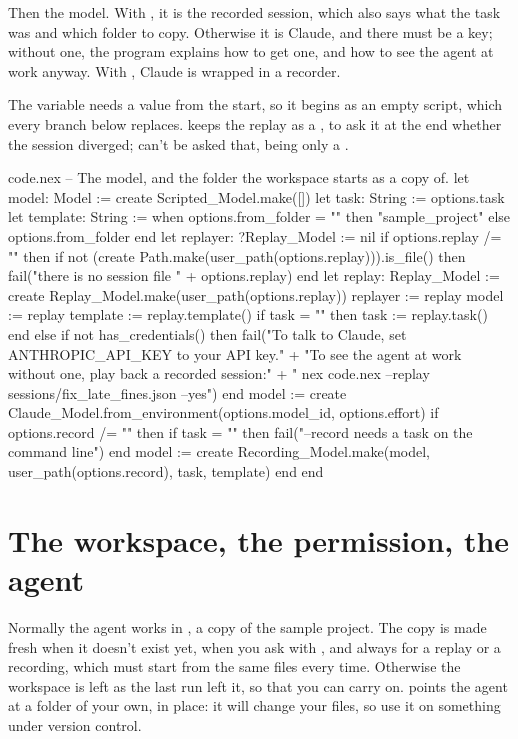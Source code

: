 Then the model. With , it is the recorded session, which
also says what the task was and which folder to copy. Otherwise it is
Claude, and there must be a key; without one, the program explains how to
get one, and how to see the agent at work anyway. With ,
Claude is wrapped in a recorder.

The variable  needs a value from the start, so it begins as an
empty script, which every branch below replaces.  keeps the
replay as a , to ask it at the end whether the session
diverged;  can't be asked that, being only a .

\begin{continued}{code.nex}
-- The model, and the folder the workspace starts as a copy of.
let model: Model := create Scripted_Model.make([])
let task: String := options.task
let template: String := when options.from_folder = "" then "sample_project" else options.from_folder end
let replayer: ?Replay_Model := nil
if options.replay /= "" then
  if not (create Path.make(user_path(options.replay))).is_file() then
    fail("there is no session file " + options.replay)
  end
  let replay: Replay_Model := create Replay_Model.make(user_path(options.replay))
  replayer := replay
  model := replay
  template := replay.template()
  if task = "" then
    task := replay.task()
  end
else
  if not has_credentials() then
    fail("To talk to Claude, set ANTHROPIC_API_KEY to your API key.\n"
      + "To see the agent at work without one, play back a recorded session:\n\n"
      + "  nex code.nex --replay sessions/fix_late_fines.json --yes")
  end
  model := create Claude_Model.from_environment(options.model_id, options.effort)
  if options.record /= "" then
    if task = "" then
      fail("--record needs a task on the command line")
    end
    model := create Recording_Model.make(model, user_path(options.record), task, template)
  end
end
\end{continued}

\section{The workspace, the permission, the agent}

Normally the agent works in , a copy of the sample
project. The copy is made fresh when it doesn't exist yet, when you ask
with , and always for a replay or a recording, which must
start from the same files every time. Otherwise the workspace is left as
the last run left it, so that you can carry on.  points the
agent at a folder of your own, in place: it will change your files, so use
it on something under version control.

